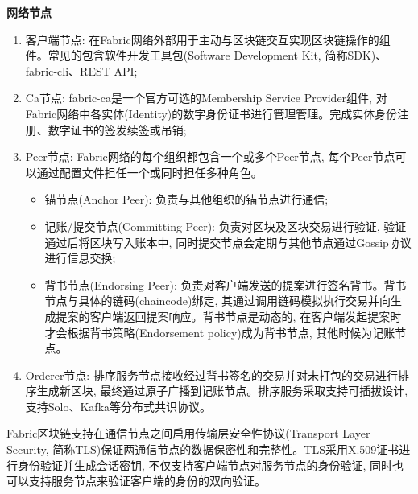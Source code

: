 \textbf{网络节点}
\begin{enumerate}[fullwidth,itemindent=2em,label=(\arabic*)]
    \item 客户端节点: 在Fabric网络外部用于主动与区块链交互实现区块链操作的组件。常见的包含软件开发工具包(Software Development Kit, 简称SDK)\footnotemark[2]、fabric-cli\footnotemark[3]、REST API\footnotemark[4];

    \item Ca节点: fabric-ca\footnotemark[5]是一个官方可选的Membership Service Provider组件, 对Fabric网络中各实体(Identity)的数字身份证书进行管理管理。完成实体身份注册、数字证书的签发续签或吊销;

    \item Peer节点: Fabric网络的每个组织都包含一个或多个Peer节点, 每个Peer节点可以通过配置文件担任一个或同时担任多种角色。

    \begin{itemize}[itemindent=2em]
        \item 锚节点(Anchor Peer): 负责与其他组织的锚节点进行通信;

        \item 记账/提交节点(Committing Peer): 负责对区块及区块交易进行验证, 验证通过后将区块写入账本中, 同时提交节点会定期与其他节点通过Gossip协议进行信息交换;

        \item 背书节点(Endorsing Peer): 负责对客户端发送的提案进行签名背书。背书节点与具体的链码(chaincode)绑定, 其通过调用链码模拟执行交易并向生成提案的客户端返回提案响应。背书节点是动态的, 在客户端发起提案时才会根据背书策略(Endorsement policy)成为背书节点, 其他时候为记账节点。
    \end{itemize}

    \item Orderer节点: 排序服务节点接收经过背书签名的交易并对未打包的交易进行排序生成新区块, 最终通过原子广播到记账节点。排序服务采取支持可插拔设计, 支持Solo、Kafka等分布式共识协议。

\end{enumerate}

Fabric区块链支持在通信节点之间启用传输层安全性协议(Transport Layer Security, 简称TLS)保证两通信节点的数据保密性和完整性。TLS采用X.509证书进行身份验证并生成会话密钥, 不仅支持客户端节点对服务节点的身份验证, 同时也可以支持服务节点来验证客户端的身份的双向验证。

